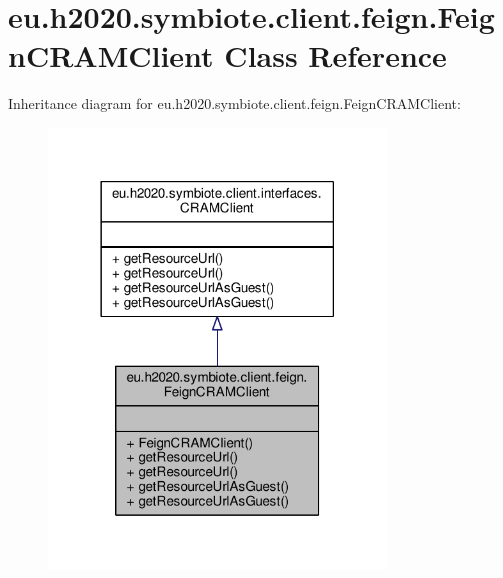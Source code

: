 \hypertarget{classeu_1_1h2020_1_1symbiote_1_1client_1_1feign_1_1FeignCRAMClient}{}\section{eu.\+h2020.\+symbiote.\+client.\+feign.\+Feign\+C\+R\+A\+M\+Client Class Reference}
\label{classeu_1_1h2020_1_1symbiote_1_1client_1_1feign_1_1FeignCRAMClient}


Inheritance diagram for eu.\+h2020.\+symbiote.\+client.\+feign.\+Feign\+C\+R\+A\+M\+Client\+:
\nopagebreak
\begin{figure}[H]
\begin{center}
\leavevmode
\includegraphics[width=254pt]{classeu_1_1h2020_1_1symbiote_1_1client_1_1feign_1_1FeignCRAMClient__inherit__graph}
\end{center}
\end{figure}


